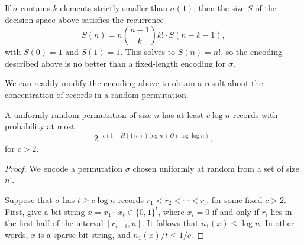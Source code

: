 If $\sigma$ contains $k$ elements strictly smaller than $\sigma(1)$,
then the size $S$ of the decision space above satisfies the recurrence
\[S(n) = n \binom{n - 1}{k} k! \cdot S(n - k - 1),\]
with $S(0) = 1$ and $S(1) = 1$. This solves to $S(n) = n!$, so the
encoding described above is no better than a fixed-length encoding for
$\sigma$.

We can readily modify the encoding above to obtain a result about the
concentration of records in a random permutation.

\begin{thm}
  A uniformly random permutation of size $n$ has at least $c \log n$
  records with probability at most
  \[2^{-c (1 - H(1/c)) \log n + O(\log \log n)},\]
  for $c > 2$.
\end{thm}
\begin{proof}
  We encode a permutation $\sigma$ chosen uniformly at random from a
  set of size $n!$.

  Suppose that $\sigma$ has $t \geq c\log n$ records $r_1 < r_2 <
  \cdots < r_t$, for some fixed $c > 2$. First, give a bit string $x =
  x_1 \cdots x_t \in \{0, 1\}^t$, where $x_i = 0$ if and only if $r_i$
  lies in the first half of the interval $[r_{i - 1}, n]$. It follows
  that $n_1(x) \leq \log n$.
  In other words, $x$ is a sparse bit string, and $n_1(x)/t \leq 1/c$.


\end{proof}
